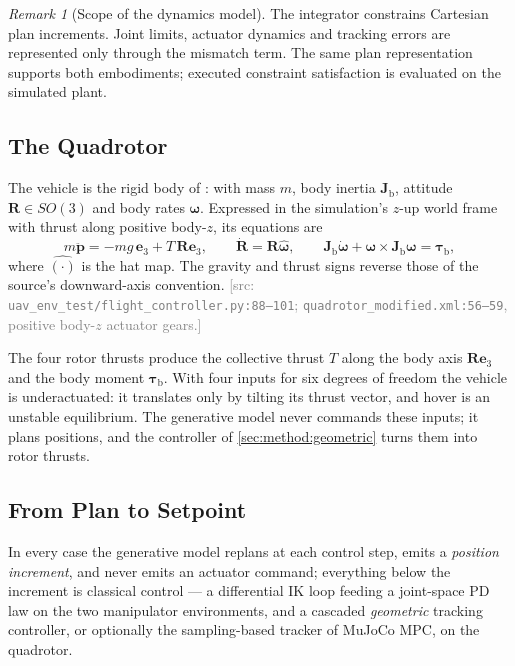 \documentclass[headsepline,footsepline,footinclude=false,oneside,fontsize=11pt,paper=a4,listof=totoc,bibliography=totoc]{scrbook}
\theoremstyle{definition}
\theoremstyle{plain}
\theoremstyle{remark}
\newtheorem{remark}{Remark}[chapter]
\newcommand{\vect}[1]{\boldsymbol{#1}}
\newcommand{\matr}[1]{\boldsymbol{#1}}
\newcommand{\sidx}[1]{_{\textrm{#1}}}
\newcommand{\unitvec}[1]{\textbf{e}_{#1}}
\newif\ifsubmission
\newcommand{\srcnote}[1]{\ifsubmission\else\textcolor{gray}{\footnotesize\textsf{[src: #1]}}\fi}
\begin{document}
\begin{remark}[Scope of the dynamics model]\label{rem:eulermodel}
The integrator constrains Cartesian plan increments. Joint limits, actuator dynamics and tracking
errors are represented only through the mismatch term. The same plan representation supports both
embodiments; executed constraint satisfaction is evaluated on the simulated plant.
\end{remark}

\subsection{The Quadrotor}\label{sec:method:quadrotor}

The vehicle is the rigid body of \parencite[Eqs.~(2)--(5)]{lee2010geometric}: with mass $m$, body
inertia $\matr{J}\sidx{b}$, attitude $\matr{R}\in SO(3)$ and body rates $\vect{\omega}$.
Expressed in the simulation's $z$-up world frame with thrust along positive body-$z$, its equations are
\begin{equation}\label{eq:method:dep:plant}
  m\ddot{\vect{p}} = -m g\,\unitvec{3} + T\,\matr{R}\unitvec{3},
  \qquad
  \dot{\matr{R}} = \matr{R}\hat{\vect{\omega}},
  \qquad
  \matr{J}\sidx{b}\dot{\vect{\omega}} + \vect{\omega}\times\matr{J}\sidx{b}\vect{\omega} = \vect{\tau}\sidx{b},
\end{equation}
where $\hat{(\cdot)}$ is the hat map. The gravity and thrust signs reverse those of the
source's downward-axis convention.
\srcnote{\texttt{uav\_env\_test/flight\_controller.py:88--101};
\texttt{quadrotor\_modified.xml:56--59}, positive body-$z$ actuator gears.}

The four rotor thrusts produce the collective thrust $T$ along the body axis $\matr{R}\unitvec{3}$ and
the body moment $\vect{\tau}\sidx{b}$. With four inputs for six degrees of freedom the vehicle is
underactuated: it translates only by tilting its thrust vector, and hover is an unstable equilibrium.
The generative model never commands these inputs; it plans positions, and the controller of
\autoref{sec:method:geometric} turns them into rotor thrusts.

\subsection{From Plan to Setpoint}\label{sec:method:setpoint}

In every case the generative model replans at each control step, emits a \emph{position increment},
and never emits an actuator command; everything below the increment is classical control --- a
differential \ac{IK} loop feeding a joint-space PD law on the two manipulator environments, and a
cascaded \emph{geometric} tracking controller, or optionally the sampling-based tracker of MuJoCo MPC,
on the quadrotor.
\end{document}
